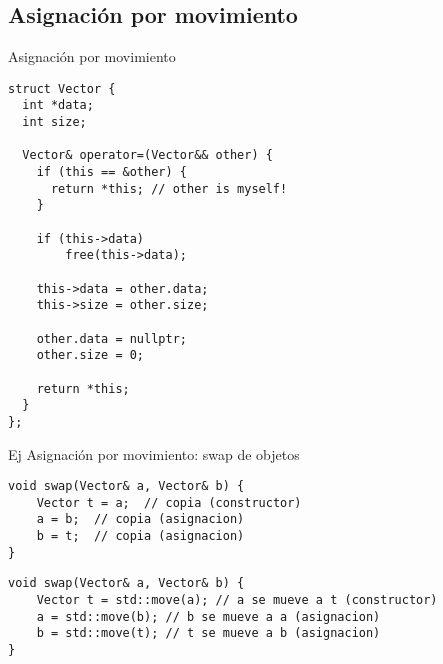 \subsection{Asignaci\'on por movimiento}
\begin{frame}{Asignaci\'on por movimiento}{}
        \begin{lstlisting}[style=normal,firstnumber=1]
struct Vector {
  int *data;
  int size;

  Vector& operator=(Vector&& other) {
    if (this == &other) {
      return *this; // other is myself!
    }

    if (this->data)
        free(this->data);

    this->data = other.data;
    this->size = other.size;

    other.data = nullptr;
    other.size = 0;

    return *this;
  }
};
        \end{lstlisting}
\end{frame}

\begin{frame}[fragile]{Ej Asignaci\'on por movimiento: swap de objetos}{}
        \begin{lstlisting}[style=normal,firstnumber=10]
void swap(Vector& a, Vector& b) {
    Vector t = a;  // copia (constructor)
    a = b;  // copia (asignacion)
    b = t;  // copia (asignacion)
}
        \end{lstlisting}
        \begin{lstlisting}[style=normal,firstnumber=10]
void swap(Vector& a, Vector& b) {
    Vector t = std::move(a); // a se mueve a t (constructor)
    a = std::move(b); // b se mueve a a (asignacion)
    b = std::move(t); // t se mueve a b (asignacion)
}
        \end{lstlisting}
\end{frame}


